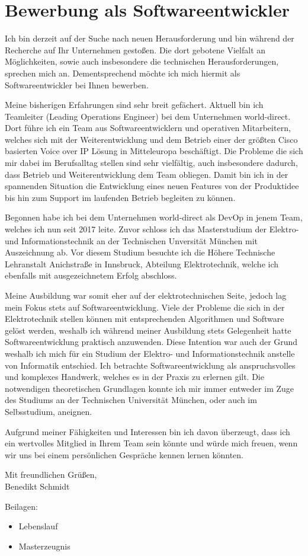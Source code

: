 \section*{Bewerbung als Softwareentwickler}
Ich bin derzeit auf der Suche nach neuen Herausforderung und bin während der Recherche auf Ihr Unternehmen gestoßen. Die dort gebotene Vielfalt an Möglichkeiten, sowie auch insbesondere die technischen Herausforderungen, sprechen mich an. Dementsprechend möchte ich mich hiermit als Softwareentwickler bei Ihnen bewerben. \par
Meine bisherigen Erfahrungen sind sehr breit gefächert. Aktuell bin ich Teamleiter (Leading Operations Engineer) bei dem Unternehmen world-direct. Dort führe ich ein Team aus Softwareentwicklern und operativen Mitarbeitern, welches sich mit der Weiterentwicklung und dem Betrieb einer der größten Cisco basierten Voice over IP Lösung in Mitteleuropa beschäftigt. Die Probleme die sich mir dabei im Berufsalltag stellen sind sehr vielfältig, auch insbesondere dadurch, dass Betrieb und Weiterentwicklung dem Team obliegen. Damit bin ich in der spannenden Situation die Entwicklung eines neuen Features von der Produktidee bis hin zum Support im laufenden Betrieb begleiten zu können. \par
Begonnen habe ich bei dem Unternehmen world-direct als DevOp in jenem Team, welches ich nun seit 2017 leite. Zuvor schloss ich das Masterstudium der Elektro- und Informationstechnik an der Technischen Unversität München mit Auszeichnung ab. Vor diesem Studium besuchte ich die Höhere Technische Lehranstalt Anichstraße in Innsbruck, Abteilung Elektrotechnik, welche ich ebenfalls mit ausgezeichnetem Erfolg abschloss. \par
Meine Ausbildung war somit eher auf der elektrotechnischen Seite, jedoch lag mein Fokus stets auf Softwareentwicklung. Viele der Probleme die sich in der Elektrotechnik stellen können mit entsprechenden Algorithmen und Software gelöst werden, weshalb ich während meiner Ausbildung stets Gelegenheit hatte Softwareentwicklung praktisch anzuwenden. Diese Intention war auch der Grund weshalb ich mich für ein Studium der Elektro- und Informationstechnik anstelle von Informatik entschied. Ich betrachte Softwareentwicklung als anspruchsvolles und komplexes Handwerk, welches es in der Praxis zu erlernen gilt. Die notwendigen theoretischen Grundlagen konnte ich mir immer entweder im Zuge des Studiums an der Technischen Universität München, oder auch im Selbsstudium, aneignen. \par
Aufgrund meiner Fähigkeiten und Interessen bin ich davon überzeugt, dass ich ein wertvolles Mitglied in Ihrem Team sein könnte und würde mich freuen, wenn wir uns bei einem persönlichen Gespräche kennen lernen könnten. \par
\vspace{0.5cm}
\indent Mit freundlichen Grüßen, \\
\indent Benedikt Schmidt \par
\vspace{0.5cm}
Beilagen:
\begin{itemize}
	\item Lebenslauf
	\item Masterzeugnis
\end{itemize}
